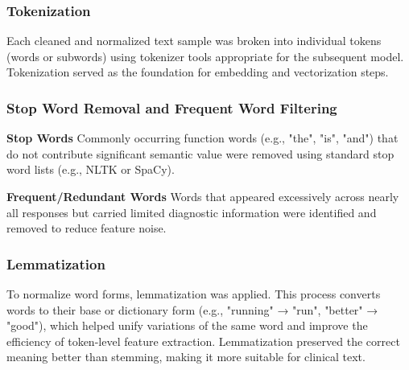 \subsubsection{Tokenization}
Each cleaned and normalized text sample was broken into individual tokens (words or subwords) using tokenizer tools appropriate for the subsequent model. Tokenization served as the foundation for embedding and vectorization steps.

\subsubsection{Stop Word Removal and Frequent Word Filtering}
\textbf{Stop Words} Commonly occurring function words (e.g., "the", "is", "and") that do not contribute significant semantic value were removed using standard stop word lists (e.g., NLTK or SpaCy).

\textbf{Frequent/Redundant Words} Words that appeared excessively across nearly all responses but carried limited diagnostic information were identified and removed to reduce feature noise.

\subsubsection{Lemmatization}
To normalize word forms, lemmatization was applied. This process converts words to their base or dictionary form (e.g., "running" → "run", "better" → "good"), which helped unify variations of the same word and improve the efficiency of token-level feature extraction. Lemmatization preserved the correct meaning better than stemming, making it more suitable for clinical text.


